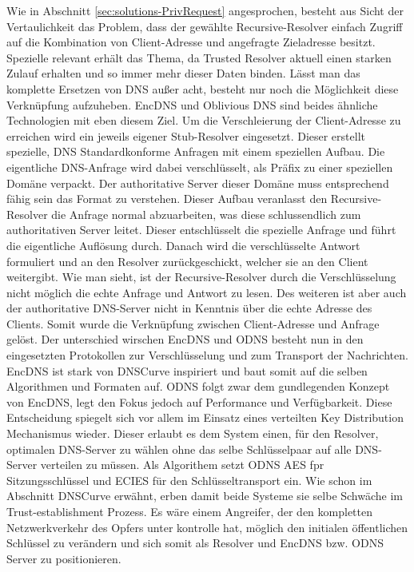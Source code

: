 Wie in Abschnitt \ref{sec:solutions-PrivRequest} angesprochen, besteht aus Sicht der Vertaulichkeit das Problem, dass der gewählte Recursive-Resolver einfach Zugriff auf die Kombination von Client-Adresse und angefragte Zieladresse besitzt. Spezielle relevant erhält das Thema, da Trusted Resolver aktuell einen starken Zulauf erhalten und so immer mehr dieser Daten binden. Lässt man das komplette Ersetzen von DNS außer acht, besteht nur noch die Möglichkeit diese Verknüpfung aufzuheben. 
EncDNS\cite{Herrmann2014} und Oblivious DNS\cite{Schmitt2018} sind beides ähnliche Technologien mit eben diesem Ziel. Um die Verschleierung der Client-Adresse zu erreichen wird ein jeweils eigener Stub-Resolver eingesetzt. Dieser erstellt spezielle, DNS Standardkonforme Anfragen mit einem speziellen Aufbau. Die eigentliche DNS-Anfrage wird dabei verschlüsselt, als Präfix zu einer speziellen Domäne verpackt. Der authoritative Server dieser Domäne muss entsprechend fähig sein das Format zu verstehen. Dieser Aufbau veranlasst den Recursive-Resolver die Anfrage normal abzuarbeiten, was diese schlussendlich zum authoritativen Server leitet. Dieser entschlüsselt die spezielle Anfrage und führt die eigentliche Auflösung durch. Danach wird die verschlüsselte Antwort formuliert und an den Resolver zurückgeschickt, welcher sie an den Client weitergibt.
Wie man sieht, ist der Recursive-Resolver durch die Verschlüsselung nicht möglich die echte Anfrage und Antwort zu lesen. Des weiteren ist aber auch der authoritative DNS-Server nicht in Kenntnis über die echte Adresse des Clients. Somit wurde die Verknüpfung zwischen Client-Adresse und Anfrage gelöst.
Der unterschied wirschen EncDNS und ODNS besteht nun in den eingesetzten Protokollen zur Verschlüsselung und zum Transport der Nachrichten. EncDNS ist stark von DNSCurve inspiriert und baut somit auf die selben Algorithmen und Formaten auf. ODNS folgt zwar dem gundlegenden Konzept von EncDNS, legt den Fokus jedoch auf Performance und Verfügbarkeit. Diese Entscheidung spiegelt sich vor allem im Einsatz eines verteilten Key Distribution Mechanismus wieder. Dieser erlaubt es dem System einen, für den Resolver, optimalen DNS-Server zu wählen ohne das selbe Schlüsselpaar auf alle DNS-Server verteilen zu müssen. Als Algorithem setzt ODNS AES fpr Sitzungsschlüssel und ECIES für den Schlüsseltransport ein.
Wie schon im Abschnitt DNSCurve erwähnt, erben damit beide Systeme sie selbe Schwäche im Trust-establishment Prozess. Es wäre einem Angreifer, der den kompletten Netzwerkverkehr des Opfers unter kontrolle hat, möglich den initialen öffentlichen Schlüssel zu verändern und sich somit als Resolver und EncDNS bzw. ODNS Server zu positionieren.

